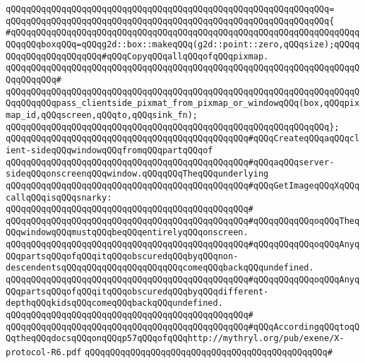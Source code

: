 \verb|qQQqqQQqqQQqqQQqqQQqqQQqqQQqqQQqqQQqqQQqqQQqqQQqqQQqqQQqqQQqqQQq=|\newline
\verb|qQQqqQQqqQQqqQQqqQQqqQQqqQQqqQQqqQQqqQQqqQQqqQQqqQQqqQQqqQQqqQQq{|\newline
\verb|#qQQqqQQqqQQqqQQqqQQqqQQqqQQqqQQqqQQqqQQqqQQqqQQqqQQqqQQqqQQqqQQqqQQqqQQqqQQqboxqQQq=qQQqg2d::box::makeqQQq(g2d::point::zero,qQQqsize);qQQqqQQqqQQqqQQqqQQqqQQq#qQQqCopyqQQqallqQQqofqQQqpixmap.|\newline
\verb|qQQqqQQqqQQqqQQqqQQqqQQqqQQqqQQqqQQqqQQqqQQqqQQqqQQqqQQqqQQqqQQqqQQqqQQqqQQqqQQq#|\newline
\verb|qQQqqQQqqQQqqQQqqQQqqQQqqQQqqQQqqQQqqQQqqQQqqQQqqQQqqQQqqQQqqQQqqQQqqQQqqQQqqQQqpass_clientside_pixmat_from_pixmap_or_windowqQQq(box,qQQqpixmap_id,qQQqscreen,qQQqto,qQQqsink_fn);|\newline
\verb|qQQqqQQqqQQqqQQqqQQqqQQqqQQqqQQqqQQqqQQqqQQqqQQqqQQqqQQqqQQqqQQq};|\newline
\newline
\verb|qQQqqQQqqQQqqQQqqQQqqQQqqQQqqQQqqQQqqQQqqQQqqQQq#qQQqCreateqQQqaqQQqclient-sideqQQqwindowqQQqfromqQQqpartqQQqof|\newline
\verb|qQQqqQQqqQQqqQQqqQQqqQQqqQQqqQQqqQQqqQQqqQQqqQQq#qQQqaqQQqserver-sideqQQqonscreenqQQqwindow.qQQqqQQqTheqQQqunderlying|\newline
\verb|qQQqqQQqqQQqqQQqqQQqqQQqqQQqqQQqqQQqqQQqqQQqqQQq#qQQqGetImageqQQqXqQQqcallqQQqisqQQqsnarky:|\newline
\verb|qQQqqQQqqQQqqQQqqQQqqQQqqQQqqQQqqQQqqQQqqQQqqQQq#|\newline
\verb|qQQqqQQqqQQqqQQqqQQqqQQqqQQqqQQqqQQqqQQqqQQqqQQq#qQQqqQQqqQQqoqQQqTheqQQqwindowqQQqmustqQQqbeqQQqentirelyqQQqonscreen.|\newline
\verb|qQQqqQQqqQQqqQQqqQQqqQQqqQQqqQQqqQQqqQQqqQQqqQQq#qQQqqQQqqQQqoqQQqAnyqQQqpartsqQQqofqQQqitqQQqobscuredqQQqbyqQQqnon-descendentsqQQqqQQqqQQqqQQqqQQqqQQqcomeqQQqbackqQQqundefined.|\newline
\verb|qQQqqQQqqQQqqQQqqQQqqQQqqQQqqQQqqQQqqQQqqQQqqQQq#qQQqqQQqqQQqoqQQqAnyqQQqpartsqQQqofqQQqitqQQqobscuredqQQqbyqQQqdifferent-depthqQQqkidsqQQqcomeqQQqbackqQQqundefined.|\newline
\verb|qQQqqQQqqQQqqQQqqQQqqQQqqQQqqQQqqQQqqQQqqQQqqQQq#|\newline
\verb|qQQqqQQqqQQqqQQqqQQqqQQqqQQqqQQqqQQqqQQqqQQqqQQq#qQQqAccordingqQQqtoqQQqtheqQQqdocsqQQqonqQQqp57qQQqofqQQqhttp://mythryl.org/pub/exene/X-protocol-R6.pdf|\newline
\verb|qQQqqQQqqQQqqQQqqQQqqQQqqQQqqQQqqQQqqQQqqQQqqQQq#|\newline

